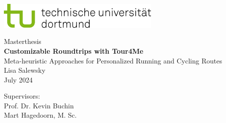 \begin{titlepage}
\vspace*{-2cm}
\newlength{\links}
\setlength{\links}{-1.5cm}
\sffamily
\hspace*{\links}
\begin{minipage}{12.5cm}
\includegraphics[width=8cm]{bilder/tud_logo_rgb}
\end{minipage}

\vspace*{4cm}

\hspace*{\links}
\hspace*{-0.2cm}
\begin{minipage}{9cm}
\large
\begin{center}
{\Large Masterthesis} \\
\vspace*{1cm}
\textbf{Customizable Roundtrips with Tour4Me} \\
\normalsize{Meta-heuristic Approaches for Personalized Running and Cycling Routes}\\
\vspace*{1cm}
\large{Lisa Salewsky\\
July 2024}
\end{center}
\end{minipage}
\normalsize
\vspace*{5.5cm}


\vspace*{2.1cm}

\hspace*{\links}
\begin{minipage}[b]{5cm}
\raggedright
Supervisors: \\
Prof. Dr. Kevin Buchin\\
Mart Hagedoorn, M. Sc. \\
\end{minipage}


\end{titlepage}
